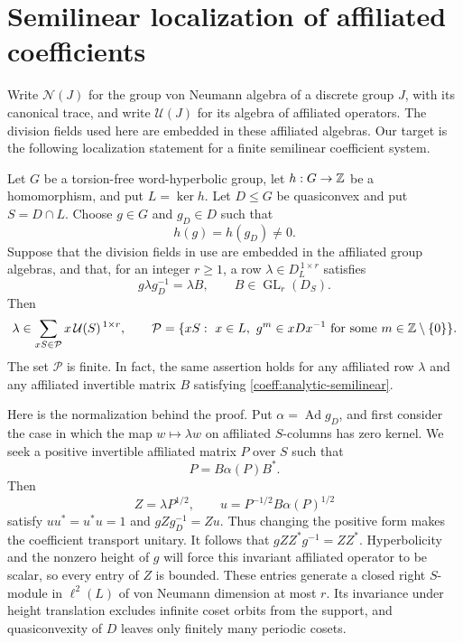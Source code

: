 \section{Semilinear localization of affiliated coefficients}
\label{sec:analytic-localization}
\label{coeff:analytic}

Write \(\mathcal N(J)\) for the group von Neumann algebra of a discrete
group \(J\), with its canonical trace, and write \(\mathcal U(J)\) for
its algebra of affiliated operators.  The division fields used here are
embedded in these affiliated algebras. Our target is the following
localization statement for a finite semilinear coefficient system.

\begin{lemma}
\label{coeff:analytic-support}
Let \(G\) be a torsion-free word-hyperbolic group, let
\(h:G\to\mathbb Z\) be a homomorphism, and put \(L=\ker h\).
Let \(D\le G\) be quasiconvex and put \(S=D\cap L\).
Choose \(g\in G\) and \(g_D\in D\) such that
\[
 h(g)=h(g_D)\ne0.
\]
Suppose that the division fields in use are embedded in the affiliated
group algebras, and that, for an integer \(r\ge1\), a row
\(\lambda\in D_L^{\,1\times r}\) satisfies
\begin{equation}\label{coeff:analytic-semilinear}
 g\lambda g_D^{-1}=\lambda B,\qquad
 B\in\operatorname{GL}_r(D_S).
\end{equation}
Then
\begin{equation}\label{coeff:analytic-support-conclusion}
 \lambda\in\sum_{xS\in\mathcal P}x\,\mathcal U(S)^{\,1\times r},
 \qquad
 \mathcal P=
 \{xS:\ x\in L,\ g^m\in xDx^{-1}
                    \text{ for some }m\in\mathbb Z\setminus\{0\}\}.
\end{equation}
The set \(\mathcal P\) is finite.  In fact, the same assertion holds
for any affiliated row \(\lambda\) and any affiliated invertible
matrix \(B\) satisfying \eqref{coeff:analytic-semilinear}.
\end{lemma}

Here is the normalization behind the proof. Put
\(\alpha=\operatorname{Ad}g_D\), and first consider the case in
which the map \(w\mapsto\lambda w\) on affiliated \(S\)-columns
has zero kernel. We seek a positive invertible affiliated matrix
\(P\) over \(S\) such that
\[
 P=B\alpha(P)B^*.
\]
Then
\[
 Z=\lambda P^{1/2},\qquad
 u=P^{-1/2}B\alpha(P)^{1/2}
\]
satisfy \(uu^*=u^*u=1\) and \(gZg_D^{-1}=Zu\).
Thus changing the positive form makes the coefficient transport
unitary. It follows that \(gZZ^*g^{-1}=ZZ^*\). Hyperbolicity and
the nonzero height of \(g\) will force this invariant affiliated
operator to be scalar, so every entry of \(Z\) is bounded.
These entries generate a closed right \(S\)-module in \(\ell^2(L)\)
of von Neumann dimension at most \(r\). Its invariance under height
translation excludes infinite
coset orbits from the support, and quasiconvexity of \(D\) leaves
only finitely many periodic cosets.

